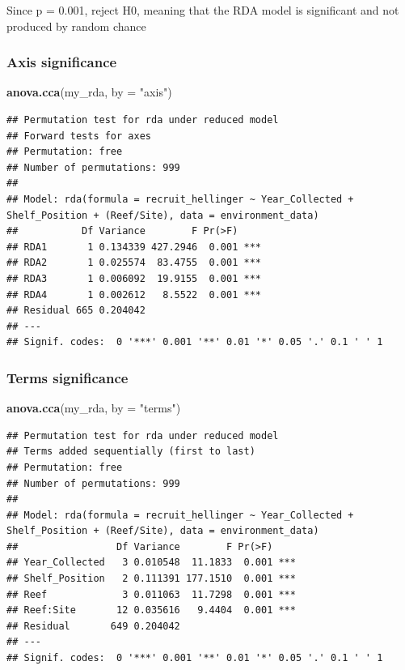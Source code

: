 \documentclass[
]{article}
\newenvironment{Shaded}{\begin{snugshade}}{\end{snugshade}}
\newcommand{\AttributeTok}[1]{\textcolor[rgb]{0.13,0.29,0.53}{#1}}
\newcommand{\FunctionTok}[1]{\textcolor[rgb]{0.13,0.29,0.53}{\textbf{#1}}}
\newcommand{\NormalTok}[1]{#1}
\newcommand{\StringTok}[1]{\textcolor[rgb]{0.31,0.60,0.02}{#1}}
\begin{document}
Since p = 0.001, reject H0, meaning that the RDA model is significant
and not produced by random chance

\subsubsection{Axis significance}\label{axis-significance}

\begin{Shaded}
\begin{Highlighting}[]
\FunctionTok{anova.cca}\NormalTok{(my\_rda, }\AttributeTok{by =} \StringTok{"axis"}\NormalTok{)}
\end{Highlighting}
\end{Shaded}

\begin{verbatim}
## Permutation test for rda under reduced model
## Forward tests for axes
## Permutation: free
## Number of permutations: 999
## 
## Model: rda(formula = recruit_hellinger ~ Year_Collected + Shelf_Position + (Reef/Site), data = environment_data)
##           Df Variance        F Pr(>F)    
## RDA1       1 0.134339 427.2946  0.001 ***
## RDA2       1 0.025574  83.4755  0.001 ***
## RDA3       1 0.006092  19.9155  0.001 ***
## RDA4       1 0.002612   8.5522  0.001 ***
## Residual 665 0.204042                    
## ---
## Signif. codes:  0 '***' 0.001 '**' 0.01 '*' 0.05 '.' 0.1 ' ' 1
\end{verbatim}

\subsubsection{Terms significance}\label{terms-significance}

\begin{Shaded}
\begin{Highlighting}[]
\FunctionTok{anova.cca}\NormalTok{(my\_rda, }\AttributeTok{by =} \StringTok{"terms"}\NormalTok{)}
\end{Highlighting}
\end{Shaded}

\begin{verbatim}
## Permutation test for rda under reduced model
## Terms added sequentially (first to last)
## Permutation: free
## Number of permutations: 999
## 
## Model: rda(formula = recruit_hellinger ~ Year_Collected + Shelf_Position + (Reef/Site), data = environment_data)
##                 Df Variance        F Pr(>F)    
## Year_Collected   3 0.010548  11.1833  0.001 ***
## Shelf_Position   2 0.111391 177.1510  0.001 ***
## Reef             3 0.011063  11.7298  0.001 ***
## Reef:Site       12 0.035616   9.4404  0.001 ***
## Residual       649 0.204042                    
## ---
## Signif. codes:  0 '***' 0.001 '**' 0.01 '*' 0.05 '.' 0.1 ' ' 1
\end{verbatim}
\end{document}
